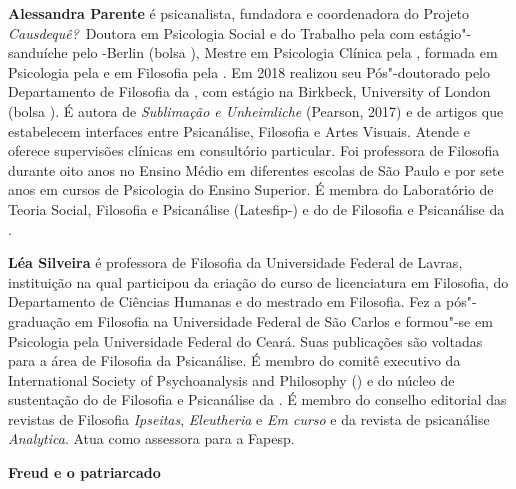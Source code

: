 \textbf{Alessandra Parente} é psicanalista, fundadora e coordenadora do
Projeto \emph{Causdequê?} Doutora em Psicologia Social e do Trabalho pela  com
estágio"-sanduíche pelo -Berlin (bolsa ), Mestre em Psicologia Clínica pela
, formada em Psicologia pela  e em Filosofia pela . Em 2018 realizou seu Pós"-doutorado pelo Departamento de Filosofia da , com estágio na
Birkbeck, University of London (bolsa ). É autora de
\emph{Sublimação e Unheimliche} (Pearson, 2017) e de artigos que estabelecem interfaces entre
Psicanálise, Filosofia e Artes Visuais. Atende e oferece supervisões clínicas em
consultório particular. Foi professora de Filosofia durante oito anos no Ensino Médio
em diferentes escolas de São Paulo e por sete anos em cursos de Psicologia do Ensino
Superior. É membra do Laboratório de Teoria Social, Filosofia e Psicanálise (Latesfip-) e do  de Filosofia e Psicanálise da .

\textbf{Léa Silveira} é professora de Filosofia da Universidade Federal de Lavras, instituição na
qual participou da criação do curso de licenciatura em Filosofia, do Departamento de
Ciências Humanas e do mestrado em Filosofia. Fez a pós"-graduação em Filosofia na
Universidade Federal de São Carlos e formou"-se em Psicologia pela Universidade
Federal do Ceará. Suas publicações são voltadas para a área de Filosofia da Psicanálise.
É membro do comitê executivo da International Society of Psychoanalysis and
Philosophy () e do núcleo de sustentação do  de Filosofia e Psicanálise da . É membro do conselho editorial das revistas de Filosofia \emph{Ipseitas}, \emph{Eleutheria} e \emph{Em curso} e da revista de psicanálise \emph{Analytica}. Atua como assessora para a Fapesp.

\textbf{Freud e o patriarcado} \lipsum[1]







